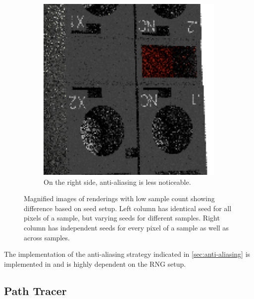 \begin{figure}[H]
\begin{subfigure}[t]{0.3\textwidth}
        \includegraphics[width=\textwidth]{resources/good-seed-anti-aliasing.png}
        \caption{On the right side, anti-aliasing is less noticeable.}
        \label{fig:rngNoiseArtifactsHighlightsGoodAnti}
    \end{subfigure}
    \hspace*{2cm}
    \caption{Magnified images of renderings with low sample count showing difference based on seed setup. Left column has identical seed for all pixels of a sample, but varying seeds for different samples. Right column has independent seeds for every pixel of a sample as well as across samples.}
    \label{fig:rngNoiseArtifactsHighlights}
\end{figure}

\label{sec:anti-aliasing-implementation}
The implementation of the anti-aliasing strategy indicated in \ref{sec:anti-aliasing} is implemented in  and is highly dependent on the \gls{RNG} setup.

\subsection*{Path Tracer}


